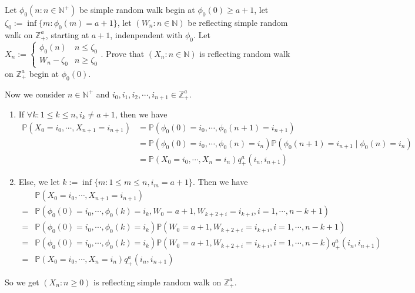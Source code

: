 \documentclass{ctexart}
\begin{document}
\begin{problem}\label{pro:4}
  Let \(\phi_0(n:n \in \mathbb{N}^+)\) be simple random walk begin at \(\phi_0(0) \geq a+1\),
  let \(\zeta_0:=\inf \{m:\phi_0(m)=a+1\}\), let \((W_n:n \in \mathbb{N})\) be reflecting simple random walk on \(\mathbb{Z}^a_+\), starting at \(a+1\), indenpendent with \(\phi_0\).
  Let \(X_n:=\begin{cases}
    \phi_0(n)   & n \leq \zeta_0 \\
    W_n-\zeta_0 & n \geq \zeta_0
  \end{cases}\).
  Prove that \((X_n:n \in \mathbb{N})\) is reflecting random walk on \(\mathbb{Z}^a_+\) begin at \(\phi_0(0)\).
\end{problem}
\begin{solution}
  Now we consider \(n \in \mathbb{N}^+\) and \(i_0,i_1,i_2,\cdots,i_{n+1}  \in \mathbb{Z}^a_+\).
  \begin{enumerate}
    \item If \(\forall k:1 \leq k \leq n,i_k \neq a+1\), then we have
      \[
        \begin{aligned}
          \mathbb{P}(X_0=i_0,\cdots,X_{n+1} =i_{n+1} ) & =\mathbb{P}(\phi_0(0)=i_0,\cdots,\phi_0(n+1)=i_{n+1} )                                            \\
                                                       & =\mathbb{P}(\phi_0(0)=i_0,\cdots,\phi_0(n)=i_n)\mathbb{P}(\phi_0(n+1)=i_{n+1} \mid \phi_0(n)=i_n) \\
                                                       & =\mathbb{P}(X_0=i_0,\cdots,X_n=i_n)q^a_+(i_n,i_{n+1})
        \end{aligned}
      \]
    \item Else, we let \(k:=\inf \{m:1 \leq m \leq n,i_m=a+1\}\).
      Then we have
      \[
        \begin{aligned}
            & \mathbb{P}(X_0=i_0,\cdots,X_{n+1}=i_{n+1})                                                                                  \\
          = & \mathbb{P}(\phi_0(0)=i_0,\cdots,\phi_0(k)=i_k,W_0=a+1,W_{k + 2 + i}=i_{k+i},i=1,\cdots, n-k + 1)                            \\
          = & \mathbb{P}(\phi_0(0)=i_0,\cdots,\phi_0(k)=i_k)\mathbb{P}(W_0=a+1,W_{k + 2 + i}=i_{k+i},i=1,\cdots, n-k + 1)                 \\
          = & \mathbb{P}(\phi_0(0)=i_0,\cdots,\phi_0(k)=i_k)\mathbb{P}(W_0=a+1,W_{k + 2 + i}=i_{k+i},i=1,\cdots, n-k  )q^a_+(i_n,i_{n+1}) \\
          = & \mathbb{P}(X_0=i_0,\cdots,X_n=i_n)q^a_+(i_n,i_{n+1})
        \end{aligned}
      \]
  \end{enumerate}
  So we get \((X_n:n \geq 0)\) is reflecting simple random walk on \(\mathbb{Z}^a_+\).
\end{solution}
\end{document}

